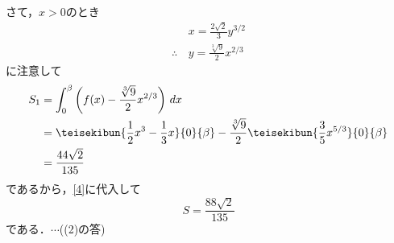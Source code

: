 \documentclass[a4j]{jarticle}
\begin{document}
\begin{multicols}{2}
さて，$x>0$のとき
     \begin{align*}
     &x=\frac{2\sqrt{2}}{3}y^{3/2} \\
     \therefore \,&y=\frac{\sqrt[3]{9}}{2}x^{2/3}
     \end{align*}
に注意して
     \begin{align*}
     S_1&=\int_0^\b \left(f(x)-\frac{\sqrt[3]{9}}{2}x^{2/3}\right)\,dx \\
     &=\teisekibun{\frac{1}{2}x^3-\frac{1}{3}x}{0}{\b}-\frac{\sqrt[3]{9}}{2}\teisekibun{\frac{3}{5}x^{5/3}}{0}{\b} \\
     &=\frac{44\sqrt{2}}{135}
     \end{align*}
であるから，\eqref{4}に代入して
     \[S=\frac{88\sqrt{2}}{135}\]
である．$\cdots$((2)の答)
\newpage
\end{multicols}
\end{document}
